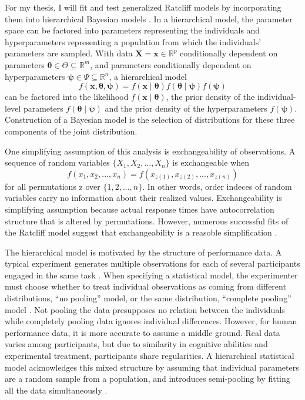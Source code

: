 \documentclass[12pt]{article}
\begin{document}
For my thesis, I will fit and test generalized Ratcliff models by incorporating them into hierarchical Bayesian models \citep{Ber1997,GelCar2013}. In a hierarchical model, the parameter space can be factored
into parameters representing the individuals and
hyperparameters representing a population from which the
individuals' parameters are sampled. With data $\boldsymbol{X} = \boldsymbol{x} \in \mathbb{R}^p$
conditionally dependent on parameters $\boldsymbol{\theta} \in \Theta
\subseteq \mathbb{R}^m$, and parameters conditionally dependent on
hyperparameters $\boldsymbol{\psi} \in \Psi \subseteq \mathbb{R}^n$, a
hierarchical model
%
\begin{equation}
f(\boldsymbol{x}, \boldsymbol{\theta}, \boldsymbol{\psi}) =
f(\boldsymbol{x} \mid \boldsymbol{\theta})
f(\boldsymbol{\theta} \mid \boldsymbol{\psi})
f(\boldsymbol{\psi})
\end{equation}
%
can be factored into the likelihood $f(\boldsymbol{x} \mid
\boldsymbol{\theta})$, the prior density of the
individual-level parameters $f(\boldsymbol{\theta} \mid
\boldsymbol{\psi})$ and the prior density of the hyperparameters $f(\boldsymbol{\psi})$. Construction of a Bayesian model is the selection of
distributions for these three components of the joint
distribution.


One simplifying assumption of this analysis is exchangeability of observations. A sequence of random variables $\{X_1, X_2, ..., X_n\}$ is exchangeable when 
\begin{equation}
f(x_1, x_2, ..., x_n) = f(x_{z(1)}, x_{z(2)}, ..., x_{z(n)})
\end{equation}
for all permutations z over $\{1, 2, ...,n\}$. In other words, order indeces of random variables carry no information about their realized values. Exchangeability is simplifying assumption because actual response times have autocorrelation structure that is altered by permutations. However, numerous successful fits of the Ratcliff model suggest that exchangeability is a reasoble simplification \citep{RatMck2008}.
	
The hierarchical model is motivated
by the structure of performance data. A typical experiment generates
multiple observations for each of several participants engaged in the
same task \citep{RatMck2008,Wag2009}. When specifying a statistical
model, the experimenter must choose whether to treat individual observations as coming from different distributions, ``no pooling'' model, or the same distribution, ``complete pooling'' model \citep{RouLu2005,RouLu22005,RouMor2014}. Not pooling the data presupposes no relation between the individuals while completely
pooling data ignores individual differences. However, for human
performance data, it is more accurate to assume a middle ground. Real
data varies among participants, but due to similarity in cognitive
abilities and experimental treatment, participants share regularities. A hierarchical statistical model acknowledges this mixed
structure by assuming that individual parameters are a random sample
from a population, and introduces 
semi-pooling by fitting all the data simultaneously \citep{GelCar2013}.
\end{document}
